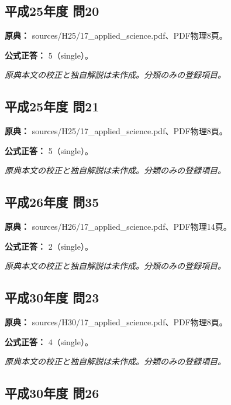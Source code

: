 \subsection{平成25年度 問20}
\label{q:h25-reg-applied-20}

\noindent\textbf{原典：} sources/H25/17\_applied\_science.pdf、PDF物理8頁。

\textbf{公式正答：} 5（single）。

\par\textit{原典本文の校正と独自解説は未作成。分類のみの登録項目。}

\subsection{平成25年度 問21}
\label{q:h25-reg-applied-21}

\noindent\textbf{原典：} sources/H25/17\_applied\_science.pdf、PDF物理8頁。

\textbf{公式正答：} 5（single）。

\par\textit{原典本文の校正と独自解説は未作成。分類のみの登録項目。}

\subsection{平成26年度 問35}
\label{q:h26-reg-applied-35}

\noindent\textbf{原典：} sources/H26/17\_applied\_science.pdf、PDF物理14頁。

\textbf{公式正答：} 2（single）。

\par\textit{原典本文の校正と独自解説は未作成。分類のみの登録項目。}

\subsection{平成30年度 問23}
\label{q:h30-reg-applied-23}

\noindent\textbf{原典：} sources/H30/17\_applied\_science.pdf、PDF物理8頁。

\textbf{公式正答：} 4（single）。

\par\textit{原典本文の校正と独自解説は未作成。分類のみの登録項目。}

\subsection{平成30年度 問26}
\label{q:h30-reg-applied-26}

